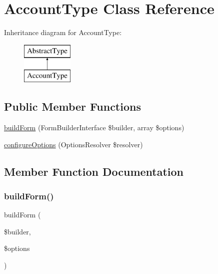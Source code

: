 \hypertarget{class_app_1_1_form_1_1_account_type}{}\section{Account\+Type Class Reference}
\label{class_app_1_1_form_1_1_account_type}
Inheritance diagram for Account\+Type\+:\begin{figure}[H]
\begin{center}
\leavevmode
\includegraphics[height=2.000000cm]{class_app_1_1_form_1_1_account_type}
\end{center}
\end{figure}
\subsection*{Public Member Functions}
\begin{DoxyCompactItemize}
\item 
\mbox{\hyperlink{class_app_1_1_form_1_1_account_type_a83c3745710374f9c5a1eb0686fe2dfab}{build\+Form}} (Form\+Builder\+Interface \$builder, array \$options)
\item 
\mbox{\hyperlink{class_app_1_1_form_1_1_account_type_a8ff68a86f5090b5df973286836e46ead}{configure\+Options}} (Options\+Resolver \$resolver)
\end{DoxyCompactItemize}


\subsection{Member Function Documentation}
\mbox{\label{class_app_1_1_form_1_1_account_type_a83c3745710374f9c5a1eb0686fe2dfab}} 
\subsubsection{\texorpdfstring{buildForm()}{buildForm()}}
{\footnotesize\ttfamily build\+Form (\begin{DoxyParamCaption}\item[{Form\+Builder\+Interface}]{\$builder,  }\item[{array}]{\$options }\end{DoxyParamCaption})}

